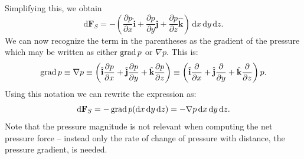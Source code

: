 Simplifying this, we obtain
\[ 
  \mathrm{d}\textbf{F}_S = - \left( \frac{\partial p}{\partial x} \hat{\textbf{i}} + \frac{\partial p}{\partial y} \hat{\textbf{j}} + \frac{\partial p}{\partial z} \hat{\textbf{k}} \right) \, \mathrm{d}x \, \mathrm{d}y \, \mathrm{d}z
.\]
We can now recognize the term in the parentheses as the gradient of the pressure which may be written as either $\operatorname{grad} p$ or $\nabla p$. This is:
\[ 
  \grad p \equiv \nabla p \equiv \left( \hat{\textbf{i}} \frac{\partial p}{\partial x} + \hat{\textbf{j}} \frac{\partial p}{\partial y} + \hat{\textbf{k}} \frac{\partial p}{\partial z}  \right) \equiv \left( \hat{\textbf{i}} \frac{\partial }{\partial x} + \hat{\textbf{j}}\frac{\partial }{\partial y} + \hat{\textbf{k}} \frac{\partial }{\partial z} \right) p
.\]
Using this notation we can rewrite the expression as:
\[ 
\mathrm{d}\textbf{F}_S = - \operatorname{grad} p(\mathrm{d}x \, \mathrm{d}y \, \mathrm{d}z) = - \nabla p \, \mathrm{d}x \, \mathrm{d}y \, \mathrm{d}z
.\]
Note that the pressure magnitude is not relevant when computing the net pressure force -- instead only the rate of change of pressure with distance, the pressure gradient, is needed. 

